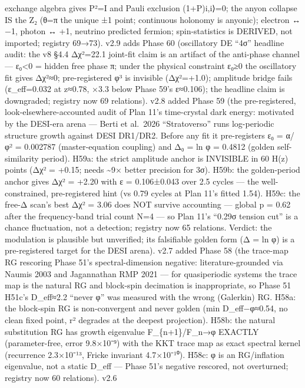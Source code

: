 \documentclass[
]{article}
\begin{document}
exchange algebra gives P²=I and Pauli exclusion (1+P)\textbar i,i⟩=0;
the anyon collapse IS the Z₂ (θ=π the unique ±1 point; continuous
holonomy is anyonic); electron ↔ −1, photon ↔ +1, neutrino predicted
fermion; spin-statistics is DERIVED, not imported; registry 69→73). v2.9
adds Phase 60 (oscillatory DE ``4σ'' headline audit: the v8 §4.4
Δχ²=22.1 joint-fit claim is an artifact of the anti-phase channel ---
ε₀\textless0 = hidden free phase π; under the physical constraint ε₀≥0
the oscillatory fit gives Δχ²≈0; pre-registered φ³ is invisible
(Δχ²=+1.0); amplitude bridge fails (ε\_eff=0.032 at z≈0.78, ×3.3 below
Phase 59's ε≈0.106); the headline claim is downgraded; registry now 69
relations). v2.8 added Phase 59 (the pre-registered,
look-elsewhere-accounted audit of Plan 11's time-crystal dark energy:
motivated by the DESI-era arena --- Berti et al.~2026 ``Stratoverso''
runs log-periodic structure growth against DESI DR1/DR2. Before any fit
it pre-registers ε₀ = α/φ² = 0.002787 (master-equation coupling) and Δ₀
= ln φ = 0.4812 (golden self-similarity period). H59a: the strict
amplitude anchor is INVISIBLE in 60 H(z) points (Δχ² = +0.15; needs
\textasciitilde9× better precision for 3σ). H59b: the golden-period
anchor gives Δχ² = +2.20 with ε = 0.106±0.043 over 2.5 cycles --- the
well-constrained, pre-registered hint (vs 0.79 cycles at Plan 11's
fitted 1.54). H59c: the free-Δ scan's best Δχ² = 3.06 does NOT survive
accounting --- global p = 0.62 after the frequency-band trial count N=4
--- so Plan 11's ``0.29σ tension cut'' is a chance fluctuation, not a
detection; registry now 65 relations. Verdict: the modulation is
plausible but unverified; its falsifiable golden form (Δ = ln φ) is a
pre-registered target for the DESI arena). v2.7 added Phase 58 (the
trace-map RG rescoring Phase 51's spectral-dimension negative:
literature-grounded via Naumis 2003 and Jagannathan RMP 2021 --- for
quasiperiodic systems the trace map is the natural RG and block-spin
decimation is inappropriate, so Phase 51 H51c's D\_eff≈2.2 ``never φ''
was measured with the wrong (Galerkin) RG. H58a: the block-spin RG is
non-convergent and never golden (min \textbar D\_eff−φ\textbar≈0.54, no
clean fixed point, r² degrades at the deepest projection). H58b: the
natural substitution RG has growth eigenvalue F\_\{n+1\}/F\_n→φ EXACTLY
(parameter-free, error 9.8×10⁻⁹) with the KKT trace map as exact
spectral kernel (recurrence 2.3×10⁻¹³, Fricke invariant 4.7×10⁻¹⁰).
H58c: φ is an RG/inflation eigenvalue, not a static D\_eff --- Phase
51's negative rescored, not overturned; registry now 60 relations). v2.6
\end{document}
